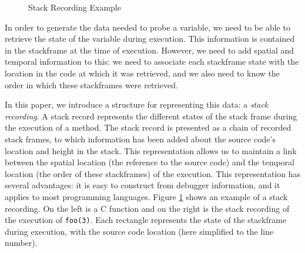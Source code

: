 \documentclass[english,submission]{programming}
\newcommand{\code}[1]{\colorbox{codegray}{\texttt{#1}}}
\begin{document}
\begin{figure}[h]
\begin{minipage}{0.7\textwidth}
  \end{minipage}
  \caption{Stack Recording Example}
  \label{fig:stack-recording}
\end{figure}

In order to generate the data needed to probe a variable, we need to be able to retrieve the state of the variable during execution. 
This information is contained in the stackframe at the time of execution. 
However, we need to add spatial and temporal information to this: we need to associate each stackframe state with the location in the code at which it was retrieved, and we also need to know the order in which these stackframes were retrieved.

In this paper, we introduce a structure for representing this data: a \textit{stack recording}. 
A stack record represents the different states of the stack frame during the execution of a method. The stack record is presented as a chain of recorded stack frames, to which information has been added about the source code's location and height in the stack.
This representation allows us to maintain a link between the spatial location (the reference to the source code) and the temporal location (the order of these stackframes) of the execution.
This representation has several advantages: it is easy to construct from debugger information, and it applies to most programming languages.
Figure \ref{fig:stack-recording} shows an example of a stack recording. On the left is a C function and on the right is the stack recording of the execution of \code{foo(3)}. Each rectangle represents the state of the stackframe during execution, with the source code location (here simplified to the line number).
\end{document}
